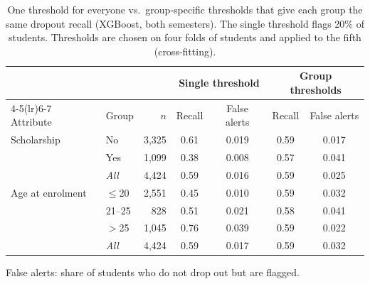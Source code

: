 \begin{table}[H]
\centering
\small
\setlength{\tabcolsep}{4pt}
\caption{One threshold for everyone vs.\ group-specific thresholds that give each group the same dropout recall (XGBoost, both semesters). The single threshold flags 20\% of students. Thresholds are chosen on four folds of students and applied to the fifth (cross-fitting).}
\label{tab:thresholds}
\begin{tabular}{llrcccc}
\toprule
 & & & \multicolumn{2}{c}{Single threshold} & \multicolumn{2}{c}{Group thresholds} \\
\cmidrule(lr){4-5}\cmidrule(lr){6-7}
Attribute & Group & $n$ & Recall & False alerts & Recall & False alerts \\
\midrule
Scholarship & No & 3{,}325 & 0.61 & 0.019 & 0.59 & 0.017 \\
 & Yes & 1{,}099 & 0.38 & 0.008 & 0.57 & 0.041 \\
 & \emph{All} & 4{,}424 & 0.59 & 0.016 & 0.59 & 0.025 \\
\addlinespace
Age at enrolment & $\le$20 & 2{,}551 & 0.45 & 0.010 & 0.59 & 0.032 \\
 & 21--25 & 828 & 0.51 & 0.021 & 0.58 & 0.041 \\
 & $>$25 & 1{,}045 & 0.76 & 0.039 & 0.59 & 0.022 \\
 & \emph{All} & 4{,}424 & 0.59 & 0.017 & 0.59 & 0.032 \\
\bottomrule
\end{tabular}
\par\smallskip\footnotesize False alerts: share of students who do not drop out but are flagged.
\end{table}
